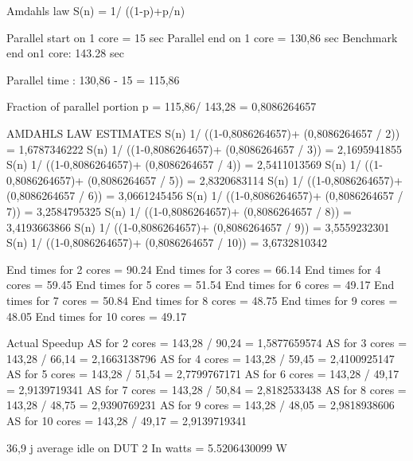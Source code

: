 

%


Amdahls law
S(n) = 1/ ((1-p)+p/n)


Parallel start on 1 core = 15 sec
Parallel end on 1 core = 130,86 sec
Benchmark end on1 core: 143.28 sec

Parallel time : 130,86 - 15 = 115,86

Fraction of parallel portion
p = 115,86/ 143,28 = 0,8086264657


AMDAHLS LAW ESTIMATES
S(n) 1/ ((1-0,8086264657)+ (0,8086264657 / 2)) = 1,6787346222
S(n) 1/ ((1-0,8086264657)+ (0,8086264657 / 3)) = 2,1695941855
S(n) 1/ ((1-0,8086264657)+ (0,8086264657 / 4)) = 2,5411013569
S(n) 1/ ((1-0,8086264657)+ (0,8086264657 / 5)) = 2,8320683114
S(n) 1/ ((1-0,8086264657)+ (0,8086264657 / 6)) = 3,0661245456
S(n) 1/ ((1-0,8086264657)+ (0,8086264657 / 7)) = 3,2584795325
S(n) 1/ ((1-0,8086264657)+ (0,8086264657 / 8)) = 3,4193663866
S(n) 1/ ((1-0,8086264657)+ (0,8086264657 / 9)) = 3,5559232301
S(n) 1/ ((1-0,8086264657)+ (0,8086264657 / 10)) = 3,6732810342

End times for 2 cores = 90.24
End times for 3 cores = 66.14
End times for 4 cores = 59.45
End times for 5 cores = 51.54
End times for 6 cores = 49.17
End times for 7 cores = 50.84
End times for 8 cores = 48.75
End times for 9 cores = 48.05
End times for 10 cores = 49.17

Actual Speedup
AS for 2 cores = 143,28 / 90,24 = 1,5877659574
AS for 3 cores = 143,28 / 66,14 = 2,1663138796
AS for 4 cores = 143,28 / 59,45 = 2,4100925147
AS for 5 cores = 143,28 / 51,54 = 2,7799767171
AS for 6 cores = 143,28 / 49,17 = 2,9139719341
AS for 7 cores = 143,28 / 50,84 = 2,8182533438
AS for 8 cores = 143,28 / 48,75 = 2,9390769231
AS for 9 cores = 143,28 / 48,05 = 2,9818938606 
AS for 10 cores = 143,28 / 49,17 = 2,9139719341

36,9 j average idle on DUT 2
In watts = 5.5206430099 W

